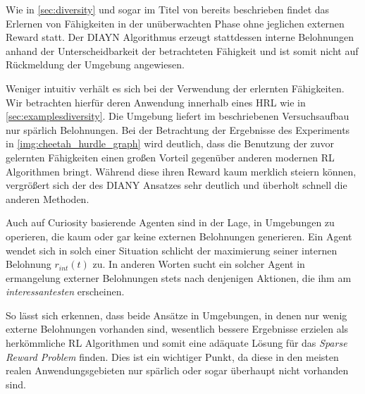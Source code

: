 Wie in \ref{sec:diversity} und sogar im Titel von \cite{diversity_eysenbach} bereits beschrieben findet das Erlernen von Fähigkeiten in der unüberwachten Phase ohne jeglichen externen Reward statt. Der DIAYN Algorithmus erzeugt stattdessen interne Belohnungen anhand der Unterscheidbarkeit der betrachteten Fähigkeit und ist somit nicht auf Rückmeldung der Umgebung angewiesen.

Weniger intuitiv verhält es sich bei der Verwendung der erlernten Fähigkeiten. Wir betrachten hierfür deren Anwendung innerhalb eines HRL wie in \ref{sec:examplesdiversity}. Die Umgebung liefert im beschriebenen Versuchsaufbau nur spärlich Belohnungen. Bei der Betrachtung der Ergebnisse des Experiments in \ref{img:cheetah_hurdle_graph} wird deutlich, dass die Benutzung der zuvor gelernten Fähigkeiten einen großen Vorteil gegenüber anderen modernen RL Algorithmen bringt. Während diese ihren Reward kaum merklich steiern können, vergrößert sich der des DIANY Ansatzes sehr deutlich und überholt schnell die anderen Methoden.

Auch auf Curiosity basierende Agenten sind in der Lage, in Umgebungen zu operieren, die kaum oder gar keine externen Belohnungen generieren. Ein Agent wendet sich in solch einer Situation schlicht der maximierung seiner internen Belohnung \(r_{int}(t)\) zu. In anderen Worten sucht ein solcher Agent in ermangelung externer Belohnungen stets nach denjenigen Aktionen, die ihm am \emph{interessantesten} erscheinen.

So lässt sich erkennen, dass beide Ansätze in Umgebungen, in denen nur wenig externe Belohnungen vorhanden sind, wesentlich bessere Ergebnisse erzielen als herkömmliche RL Algorithmen und somit eine adäquate Lösung für das \emph{Sparse Reward Problem} finden. Dies ist ein wichtiger Punkt, da diese in den meisten realen Anwendungsgebieten nur spärlich oder sogar überhaupt nicht vorhanden sind.

\bigspace


